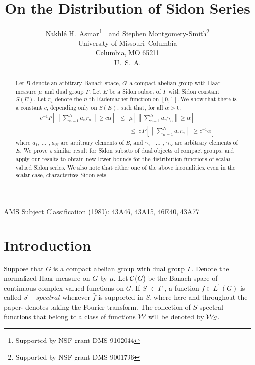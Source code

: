 
\def\Bbb#1{{\hbox{\bf #1}}}
\def\N{\Bbb N}
\def\R{\Bbb R}
\def\C{\Bbb C}

\def\Z{\Bbb Z}
\def\Con{${\cal C}$}
\def\M{${\cal M}$}
\def\T{\Bbb T}


\title{On the Distribution of Sidon Series}
\author{Nakhl\'e H.\ Asmar\thanks{Supported by NSF grant DMS 9102044}\ \ 
and Stephen Montgomery-Smith\thanks{Supported by NSF grant DMS 9001796}
\\ University of Missouri--Columbia \\ Columbia, MO 65211 \\ U.\ S.\ A.
\date{}}
\maketitle
\begin{abstract}
Let $B$ denote an arbitrary Banach space, $G$\ a compact abelian group
with Haar measure $\mu$\ and
dual group $\Gamma$. Let $E$ be a Sidon subset of $\Gamma$ with Sidon
constant $S(E)$. Let
$r_n$ denote the $n$-th Rademacher function on $[0 , 1]$.
We show that there is a constant $c$, depending only on $S(E)$, such
that, for all $\alpha > 0$:
\begin{eqnarray*}
c^{-1}P\left[\left\| \sum_{n=1}^Na_nr_n\right\| \geq
c\alpha \right] & \leq &
 \mu\left[ \left\|
\sum_{n=1}^Na_n\gamma_n\right\|\geq \alpha \right]
\\
& & \leq \ 
c\,P\left[\left\| \sum_{n=1}^Na_nr_n\right\| \geq c^{-1}\alpha
\right]
\end{eqnarray*}
 where $a_1$, $\ldots$ , $a_N$ are arbitrary elements of $B$,
and $\gamma_1$ ,
$\ldots$ , $\gamma_N$ are arbitrary elements of $E$.  We prove a similar
result for Sidon subsets of dual objects of compact groups,
and apply our results to
obtain new lower bounds for the distribution functions of scalar-valued
Sidon series.
We also note that either one of the above inequalities, even in the scalar
case, characterizes Sidon sets.
\end{abstract}

\bigskip
\bigskip
\bigskip
\bigskip
\bigskip
AMS Subject Classification (1980):  43A46, 43A15, 46E40, 43A77
\pagebreak

\section{Introduction}

Suppose that $G$ is
 a compact abelian group with dual group $\Gamma$.
Denote the normalized Haar measure on $G$ by $\mu$.  Let ${\cal
C}$($G$)
be the Banach space of continuous complex-valued functions on $G$.
 If $S$
$\subset \Gamma$ , a function $f \in L^1(G)$ is called $S-spectral$
whenever $\hat{f}$ is supported in $S$, where here and throughout the
paper
$\hat{}$ denotes taking the Fourier transform.  The collection of
$S$-spectral
functions that belong to a class of functions ${\cal W}$ will be denoted
by
${\cal W}_S$.

